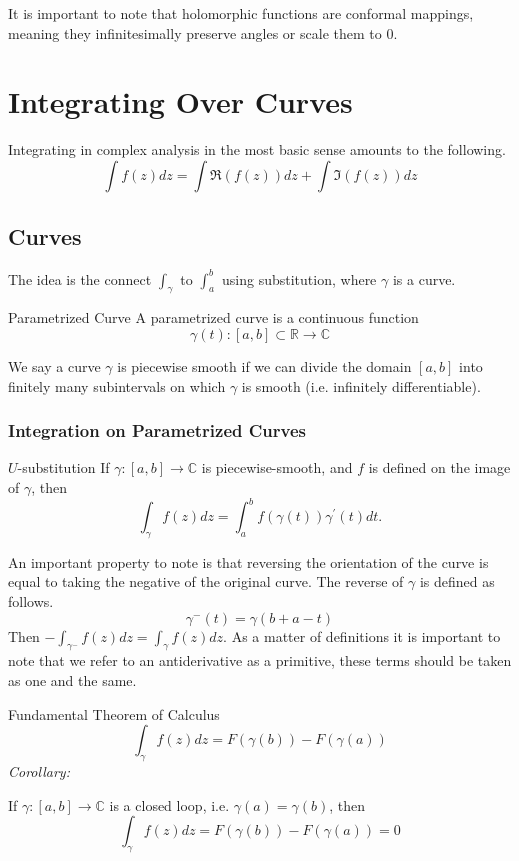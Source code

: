 \documentclass{article}
\begin{document}
It is important to note that holomorphic functions are conformal mappings, meaning they infinitesimally preserve angles or scale them to 0.

\section{Integrating Over Curves}

Integrating in complex analysis in the most basic sense amounts to the following.
\[
    \int f(z) dz = \int \Re (f(z))dz + \int \Im (f(z)) dz
\]

\subsection{Curves}

The idea is the connect \( \int _\gamma  \) to \( \int _a^b \) using substitution, where \( \gamma  \) is a curve.

\begin{defn}{Parametrized Curve}{}
A parametrized curve is a continuous function
\[
    \gamma (t): [a,b] \subset \mathbb{R} \to \mathbb{C} 
\]
\end{defn}

We say a curve \( \gamma  \) is piecewise smooth if we can divide the domain \( [a,b] \) into finitely many subintervals on which \( \gamma  \) is smooth (i.e. infinitely differentiable).

\subsubsection{Integration on Parametrized Curves}

\begin{thrm}{$U$-substitution}{}
If \( \gamma : [a,b] \to \mathbb{C}  \) is piecewise-smooth, and \( f \) is defined on the image of \( \gamma \), then 
\[
    \boxed{\int _\gamma  f(z) dz = \int ^b_a f(\gamma (t))\gamma ^\prime (t) dt.} 
\]
\end{thrm}

An important property to note is that reversing the orientation of the curve is equal to taking the negative of the original curve. The reverse of \( \gamma  \) is defined as follows.
\[
    \gamma ^-(t ) = \gamma (b + a - t)
\]
Then \(- \int _{\gamma ^-} f(z) dz = \int _\gamma f(z) dz \). As a matter of definitions it is important to note that we refer to an antiderivative as a primitive, these terms should be taken as one and the same. 

\begin{thrm}{Fundamental Theorem of Calculus}{}
\[
    \int_\gamma f(z) dz = F(\gamma (b)) - F(\gamma (a))
\]
\tcbline
\emph{Corollary:}

If \( \gamma : [a,b]\to \mathbb{C}  \) is a closed loop, i.e. \( \gamma (a) = \gamma (b) \), then 
\[
    \int _\gamma f(z) dz = F(\gamma (b)) - F(\gamma (a)) = 0
\]
\end{thrm}
\end{document}
